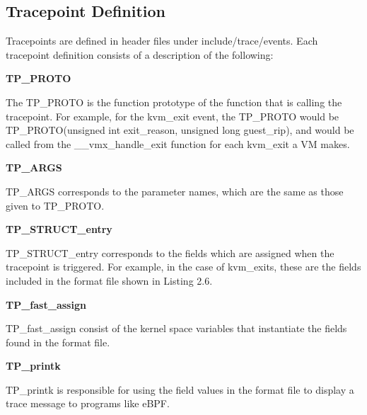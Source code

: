 \documentclass{report}
\begin{document}
\begin{spacing}{1.5}
\subsection{Tracepoint Definition}

{\large
Tracepoints are defined in header files under include/trace/events. Each tracepoint definition consists of a description of the following:
\leavevmode\newline
}

{\large
\noindent\textbf{TP\_PROTO}
\leavevmode\newline
}

{\large
\noindent The TP\_PROTO is the function prototype of the function that is calling the tracepoint. For example, for the kvm\_exit event, the TP\_PROTO would be TP\_PROTO(unsigned int exit\_reason, unsigned long guest\_rip), and would be called from the \_\_vmx\_handle\_exit function for each kvm\_exit a VM makes.
\newline
}

{\large
\noindent\textbf{TP\_ARGS}
\leavevmode\newline
}

{\large
\noindent TP\_ARGS corresponds to the parameter names, which are the same as those given to TP\_PROTO.
\newline
}

{\large
\noindent\textbf{TP\_STRUCT\_entry}
\leavevmode\newline
}

{\large
\noindent TP\_STRUCT\_entry corresponds to the fields which are assigned when the tracepoint is triggered. For example, in the case of kvm\_exits, these are the fields included in the format file shown in Listing 2.6.
\newline
}


{\large
\noindent\textbf{TP\_fast\_assign}
\leavevmode\newline
}

{\large
\noindent TP\_fast\_assign consist of the kernel space variables that instantiate the fields found in the format file. 
\newline
}

{\large
\noindent\textbf{TP\_printk}
\leavevmode\newline
}

{\large
\noindent TP\_printk is responsible for using the field values in the format file to display a trace message to programs like eBPF.
\newline
}













\end{spacing}
\end{document}
